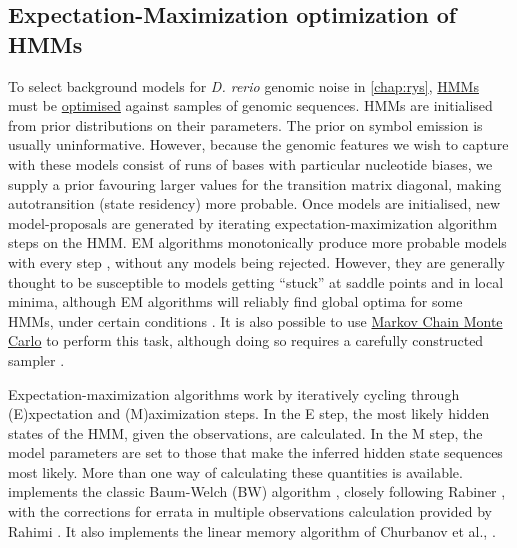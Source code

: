 \subsection{Expectation-Maximization optimization of HMMs}
\label{ssec:EM}
To select background models for \textit{D. rerio} genomic noise in \autoref{chap:rys}, \hyperref[ssec:HMM]{HMMs} must be \hyperref[ssec:MLE]{optimised} against samples of genomic sequences. HMMs are initialised from prior distributions on their parameters. The prior on symbol emission is usually uninformative. However, because the genomic features we wish to capture with these models consist of runs of bases with particular nucleotide biases, we supply a prior favouring larger values for the transition matrix diagonal, making autotransition (state residency) more probable. Once models are initialised, new model-proposals are generated by iterating expectation-maximization algorithm steps on the HMM. EM algorithms monotonically produce more probable models with every step \cite{Rabiner1989}, without any models being rejected. However, they are generally thought to be susceptible to models getting ``stuck'' at saddle points and in local minima, although EM algorithms will reliably find global optima for some HMMs, under certain conditions \cite{Yang2015b}. It is also possible to use \hyperref[ssec:MonteCarlo]{Markov Chain Monte Carlo} to perform this task, although doing so requires a carefully constructed sampler \cite{Ryden2008}.

Expectation-maximization algorithms work by iteratively cycling through (E)xpectation and (M)aximization steps. In the E step, the most likely hidden states of the HMM, given the observations, are calculated. In the M step, the model parameters are set to those that make the inferred hidden state sequences most likely. More than one way of calculating these quantities is available.  implements the classic Baum-Welch (BW) algorithm \cite{Baum1966}, closely following Rabiner \cite{Rabiner1989}, with the corrections for errata in multiple observations calculation provided by Rahimi \cite{Rahimi}. It also implements the linear memory algorithm of Churbanov et al., \cite{Churbanov2008}. 

